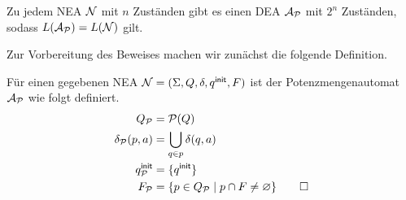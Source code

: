 \begin{Satz}\label{satz:2.rabinscott}
	Zu jedem \ac{NEA} $\mathcal{N}$ mit $n$ Zuständen gibt es einen \ac{DEA} $\mathcal{A}_{\mathcal{P}}$ mit $2^n$ Zuständen, sodass $L(\mathcal{A}_{\mathcal{P}})=L(\mathcal{N})$ gilt.
\end{Satz}
  Zur Vorbereitung des Beweises machen wir zunächst die folgende Definition.

\begin{Def}[Potenzmengenautomat]
 Für einen gegebenen \ac{NEA}  $\mathcal{N}= (\Sigma, Q,\delta,q^\mathsf{init},F)$ ist der Potenzmengenautomat $\mathcal{A}_{\mathcal{P}}$ wie folgt definiert.
         \begin{align*}
                Q_{\mathcal{P}} &= \mathcal{P}(Q)\\
                \delta_{\mathcal{P}}(p,a) &= \bigcup_{q\in p} \delta(q,a)\\
                q^\mathsf{init}_{\mathcal{P}} &= \{q^\mathsf{init}\}\\
                F_{\mathcal{P}} &= \{ p\in Q_{\mathcal{P}} \mid p\cap F\neq \varnothing \}
                \qedhere
        \end{align*}
\end{Def}
